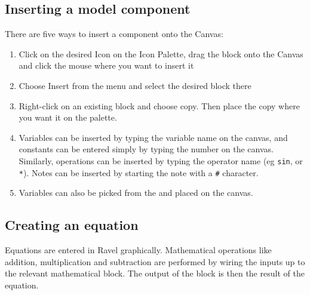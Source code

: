 \subsection{Inserting a model component}

There are five ways to insert a component onto the Canvas: 
\begin{enumerate}
\item Click on the desired Icon on the Icon Palette, drag the block onto
the Canvas and click the mouse where you want to insert it
\begin{center}
\par\end{center}
\item Choose Insert from the menu and select the desired block there


\begin{center}
 
\par\end{center}

\newpage{}
\item Right-click on an existing block and choose copy. Then place the copy
where you want it on the palette.
\begin{center}
\par\end{center}
\item Variables can be inserted by typing the variable name on the canvas,
and constants can be entered simply by typing the number on the canvas.
Similarly, operations can be inserted by typing the operator name
(eg \verb+sin+, or \verb+*+). Notes can be inserted by starting
the note with a \verb+#+ character.
\item Variables can also be picked from the 
and placed on the canvas. 
\end{enumerate}

\subsection{Creating an equation}

Equations are entered in Ravel graphically. Mathematical operations
like addition, multiplication and subtraction are performed by wiring
the inputs up to the relevant mathematical block. The output of the
block is then the result of the equation.

